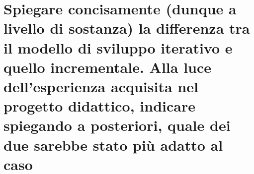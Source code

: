 \section{Spiegare concisamente (dunque a livello di sostanza) la differenza tra il modello di sviluppo iterativo e quello incrementale. Alla luce dell'esperienza acquisita nel progetto didattico, indicare spiegando a posteriori, quale dei due sarebbe stato più adatto al caso}

